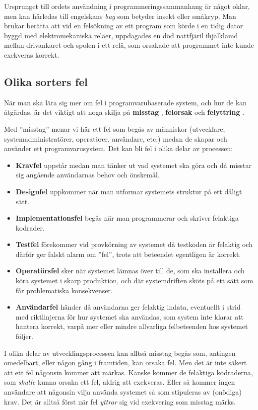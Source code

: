 Ursprunget till ordets användning i programmeringssammanhang är något oklar, men kan härledas till engelskans \emph{bug} som betyder insekt eller småkryp. 
Man brukar berätta att vid en felsökning av ett program som körde i en tidig dator byggd med  elektromekaniska reläer, uppdagades en död nattfjäril ihjälklämd mellan drivankaret och spolen i ett relä, som orsakade att programmet inte kunde exekveras korrekt. 



\subsection{Olika sorters fel}

När man ska lära sig mer om fel i programvarubaserade system, och hur de kan åtgärdas, är det viktigt att noga skilja på \textbf{misstag} , \textbf{felorsak}  och \textbf{felyttring} . 

Med ''misstag'' menar vi här ett fel som begås av människor (utvecklare, systemadministratörer, operatörer, användare, etc.) medan de skapar och använder ett programvarusystem. Det kan bli fel i olika delar av processen: 
\begin{itemize}
\item \textbf{Kravfel} uppstår medan man tänker ut vad systemet ska göra och då misstar sig angående  användarnas behov och önskemål.
\item \textbf{Designfel} uppkommer när man utformar systemets struktur på ett dåligt sätt.
\item \textbf{Implementationsfel} begås när man programmerar och skriver felaktiga kodrader. 
\item \textbf{Testfel} förekommer vid provkörning av systemet då testkoden är felaktig och därför ger falskt alarm om ''fel'', trots att beteendet egentligen är korrekt.  
\item \textbf{Operatörsfel} sker när systemet lämnas över till de, som ska installera och köra systemet i skarp produktion, och där systemdriften  sköts på ett sätt som får problematiska konsekvenser.
\item \textbf{Användarfel} händer då användarna ger felaktig indata, eventuellt i strid med riktlinjerna för hur systemet ska användas, som system inte klarar att hantera korrekt, varpå mer eller mindre allvarliga felbeteenden hos systemet följer.
\end{itemize} 
I olika delar av utvecklingsprocessen kan alltså misstag begås som, antingen omedelbart, eller någon gång i framtiden, kan orsaka fel. Men det är inte säkert att ett fel någonsin kommer att märkas. Kanske kommer de felaktiga kodraderna, som \emph{skulle} kunna orsaka ett fel, aldrig att exekveras. Eller så kommer ingen användare att någonsin vilja använda systemet så som stipuleras av (onödiga) krav. Det är alltså först när fel \emph{yttrar} sig vid exekvering som misstag märks.

